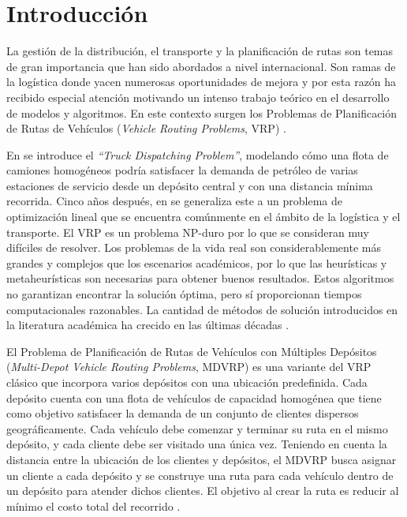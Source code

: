 \chapter*{Introducción}

La gestión de la distribución, el transporte y la planificación de rutas son temas de gran importancia que han sido abordados a nivel internacional. Son ramas de la logística donde yacen numerosas oportunidades de mejora y por esta razón ha recibido especial atención motivando un intenso trabajo teórico en el desarrollo de modelos y algoritmos. En este contexto surgen los Problemas de Planificación de Rutas de Vehículos (\textit{Vehicle Routing Problems}, VRP) \parencite{colomasalazarGestionDistribucionPlanificacion2022}.

En \parencite{g.b.dantzigTruckDispatchingProblem1959} se introduce el \textit{``Truck Dispatching Problem''}, modelando cómo una flota de camiones homogéneos podría satisfacer la demanda de petróleo de varias estaciones de servicio desde un depósito central y con una distancia mínima recorrida. Cinco a\~nos después, en \parencite{clarkeSchedulingVehiclesCentral1964} se generaliza este a un problema de optimización lineal que se encuentra comúnmente en el ámbito de la logística y el transporte. El VRP es un problema NP-duro\parencite{aroraComputationalComplexityModern2009} por lo que se consideran muy difíciles de resolver. Los problemas de la vida real son considerablemente más grandes y complejos que los escenarios académicos, por lo que las heurísticas y metaheurísticas son necesarias para obtener buenos resultados. Estos algoritmos no garantizan encontrar la solución óptima, pero sí proporcionan tiempos computacionales razonables. La cantidad de métodos de solución introducidos en la literatura académica ha crecido en las últimas décadas  \parencite{braekersVehicleRoutingProblem2016}.

El Problema de Planificación de Rutas de Vehículos con Múltiples Depósitos (\textit{Multi-Depot Vehicle Routing Problems}, MDVRP) es una variante del VRP clásico que incorpora varios depósitos con una ubicación predefinida. Cada depósito cuenta con una flota de vehículos de capacidad homogénea que tiene como objetivo satisfacer la demanda de un conjunto de clientes dispersos geográficamente. Cada vehículo debe comenzar y terminar su ruta en el mismo depósito, y cada cliente debe ser visitado una única vez. Teniendo en cuenta la distancia entre la ubicación de los clientes y depósitos, el MDVRP busca asignar un cliente a cada depósito y se construye una ruta para cada vehículo dentro de un depósito para atender dichos clientes. El objetivo al crear la ruta es reducir al mínimo el costo total del recorrido \parencite{mateosDESARROLLOMETODOHIBRIDO2013}.

